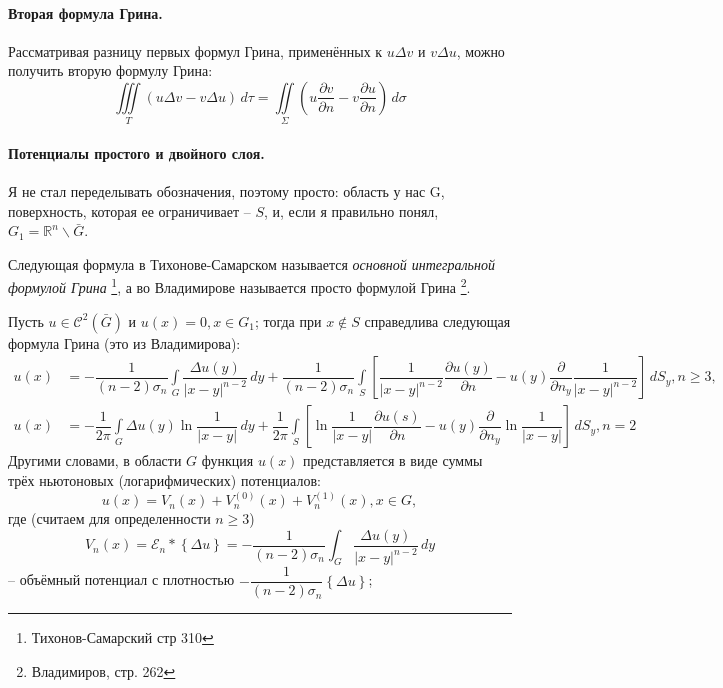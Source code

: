 \paragraph{Вторая формула Грина.}
Рассматривая разницу первых формул Грина, применённых к $u \Delta v$ и $v \Delta u$, можно
получить вторую формулу Грина:
\begin{equation}\label{eq:green2}
  \iiint \limits_T \left( u \Delta v - v \Delta u \right) \, d\tau
  = \iint \limits_\Sigma \left( u \dfrac{\partial v}{\partial n} - v \dfrac{\partial u}{\partial n}  \right) \, d\sigma
\end{equation}

\paragraph{Потенциалы простого и двойного слоя.}
Я не стал переделывать обозначения, поэтому просто: область у нас G, поверхность, которая ее
ограничивает -- $S$, и, если я правильно понял, $G_1 = \mathbb{R}^n \backslash \bar G$. 

Следующая формула в Тихонове-Самарском называется \emph{основной интегральной формулой Грина}
\footnote{Тихонов-Самарский стр 310}, а во Владимирове называется просто формулой Грина
\footnote{Владимиров, стр. 262}.

Пусть $u \in \mathcal{C}^2 (\bar G)$ и $u(x) = 0, x \in G_1$; тогда при $x \notin S$ справедлива
следующая формула Грина (это из Владимирова):
\begin{align*}
  u(x) &= - \dfrac{1}{(n-2) \sigma_n} \int\limits_G \dfrac{\Delta u(y)}{|x-y|^{n-2}} \, dy
  + \dfrac{1}{(n-2) \sigma_n} \int\limits_S \left[ 
    \dfrac{1}{|x-y|^{n-2}} \dfrac{\partial u(y)}{\partial n} 
    - u(y) \dfrac{\partial }{\partial n_y} \dfrac{1}{|x-y|^{n-2}}\right] \, dS_y, n \geqslant 3, \\
  u(x) &= - \dfrac{1}{2\pi} \int\limits_G \Delta u(y) \ln \dfrac{1}{|x-y|} \, dy
  + \dfrac{1}{2\pi} \int\limits_S \left[ 
    \ln \dfrac{1}{|x-y|} \dfrac{\partial u(s)}{\partial n} 
    - u(y) \dfrac{\partial }{\partial n_y} \ln \dfrac{1}{|x-y|} \right] \, dS_y, n=2
\end{align*}
Другими словами, в области $G$ функция $u(x)$ представляется в виде суммы трёх ньютоновых
(логарифмических) потенциалов:
\[
  u(x) = V_n(x) + V_n^{(0)} (x) + V_n^{(1)} (x), x\in G,
\]
где (считаем для определенности $n \geqslant 3$)
\[
  V_n(x) = \mathcal{E}_n * \left\{ \Delta u \right\} = - \dfrac{1}{(n-2) \sigma_n} \int_G \dfrac{\Delta u(y)}{|x-y|^{n-2}} \, dy
\]
-- объёмный потенциал с плотностью $- \dfrac{1}{(n-2) \sigma_n} \left\{ \Delta u \right\}$;

